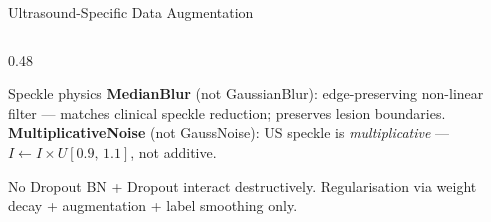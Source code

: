 \documentclass[aspectratio=169, 10pt]{beamer}
\begin{document}
\begin{frame}{Ultrasound-Specific Data Augmentation}
\begin{columns}[T]
\begin{column}{0.48\textwidth}

      \vspace{5pt}
      \begin{block}{\small Speckle physics}
        \scriptsize \textbf{MedianBlur} (not GaussianBlur): edge-preserving non-linear filter — matches clinical speckle reduction; preserves lesion boundaries. \textbf{MultiplicativeNoise} (not GaussNoise): US speckle is \emph{multiplicative} — $I \leftarrow I \times U[0.9,\,1.1]$, not additive.
      \end{block}
      \vspace{4pt}
      \begin{alertblock}{\small No Dropout}
        \scriptsize BN + Dropout interact destructively. Regularisation via weight decay + augmentation + label smoothing only.
      \end{alertblock}
    \end{column}
  \end{columns}
\end{frame}
\end{document}
